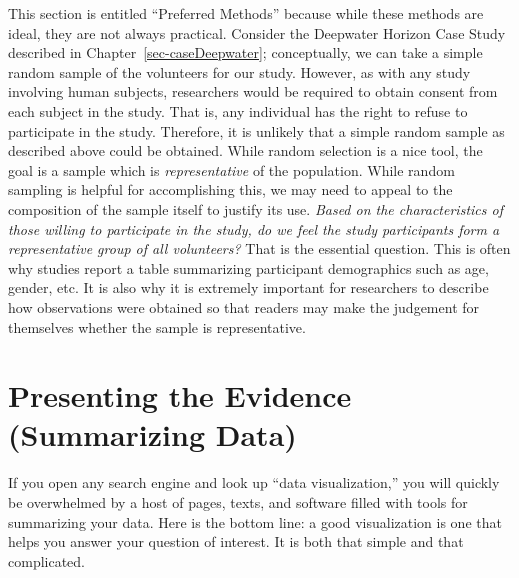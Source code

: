 \documentclass[
  letterpaper,
  DIV=11,
  numbers=noendperiod]{scrreprt}
\theoremstyle{definition}
\theoremstyle{plain}
\theoremstyle{definition}
\theoremstyle{remark}
\begin{document}
This section is entitled ``Preferred Methods'' because while these
methods are ideal, they are not always practical. Consider the Deepwater
Horizon Case Study described in Chapter~\ref{sec-caseDeepwater};
conceptually, we can take a simple random sample of the volunteers for
our study. However, as with any study involving human subjects,
researchers would be required to obtain consent from each subject in the
study. That is, any individual has the right to refuse to participate in
the study. Therefore, it is unlikely that a simple random sample as
described above could be obtained. While random selection is a nice
tool, the goal is a sample which is \emph{representative} of the
population. While random sampling is helpful for accomplishing this, we
may need to appeal to the composition of the sample itself to justify
its use. \emph{Based on the characteristics of those willing to
participate in the study, do we feel the study participants form a
representative group of all volunteers?} That is the essential question.
This is often why studies report a table summarizing participant
demographics such as age, gender, etc. It is also why it is extremely
important for researchers to describe how observations were obtained so
that readers may make the judgement for themselves whether the sample is
representative.

\hypertarget{sec-summaries}{%
\chapter{Presenting the Evidence (Summarizing
Data)}\label{sec-summaries}}

\providecommand{\norm}[1]{\lVert#1\rVert}
\providecommand{\abs}[1]{\lvert#1\rvert}
\providecommand{\iid}{\stackrel{\text{IID}}{\sim}}
\providecommand{\ind}{\stackrel{\text{Ind}}{\sim}}

\providecommand{\bm}[1]{\mathbf{#1}}
\providecommand{\bs}[1]{\boldsymbol{#1}}
\providecommand{\bbeta}{\bs{\beta}}

\providecommand{\Ell}{\mathcal{L}}
\providecommand{\indep}{\perp\negthickspace\negmedspace\perp}

If you open any search engine and look up ``data visualization,'' you
will quickly be overwhelmed by a host of pages, texts, and software
filled with tools for summarizing your data. Here is the bottom line: a
good visualization is one that helps you answer your question of
interest. It is both that simple and that complicated.
\end{document}
